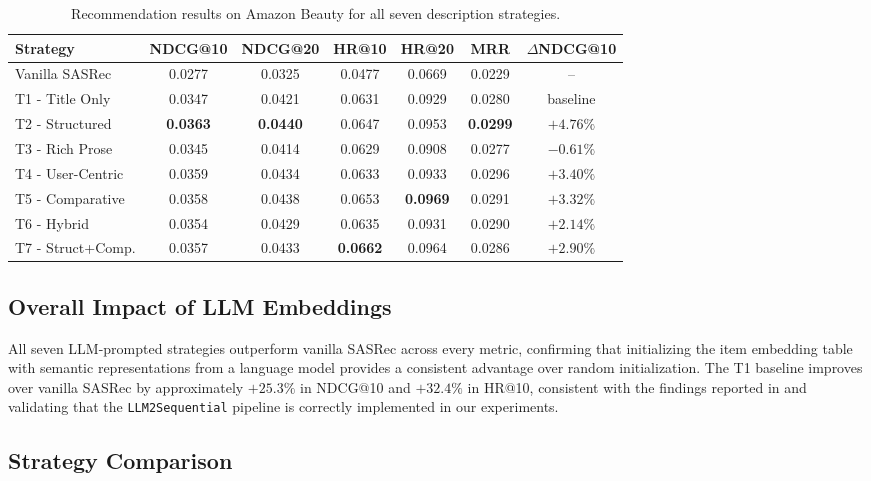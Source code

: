 \documentclass[12pt,a4paper]{report}
\begin{document}
\begin{table}[h]
\centering
\caption{Recommendation results on Amazon Beauty for all seven description strategies.}
\label{tab:promptcraft_results}
\small
\begin{tabular}{p{2.4cm} c c c c c c}
\toprule
\textbf{Strategy} & \textbf{NDCG@10} &
\textbf{NDCG@20} & \textbf{HR@10} & \textbf{HR@20} & \textbf{MRR} &
\(\Delta\)\textbf{NDCG@10} \\
\midrule
Vanilla SASRec    & 0.0277 & 0.0325 & 0.0477 & 0.0669 & 0.0229 & -- \\
\midrule
T1 - Title Only    & 0.0347 & 0.0421 & 0.0631 & 0.0929 & 0.0280 & baseline \\
T2 - Structured    & \textbf{0.0363} & \textbf{0.0440} & 0.0647 & 0.0953 & \textbf{0.0299} & \(\mathbf{+4.76\%}\) \\
T3 - Rich Prose    & 0.0345 & 0.0414 & 0.0629 & 0.0908 & 0.0277 & \(-0.61\%\) \\
T4 - User-Centric  & 0.0359 & 0.0434 & 0.0633 & 0.0933 & 0.0296 & \(+3.40\%\) \\
T5 - Comparative   & 0.0358 & 0.0438 & 0.0653 & \textbf{0.0969} & 0.0291 & \(+3.32\%\) \\
T6 - Hybrid        & 0.0354 & 0.0429 & 0.0635 & 0.0931 & 0.0290 & \(+2.14\%\) \\
T7 - Struct+Comp.  & 0.0357 & 0.0433 & \textbf{0.0662} & 0.0964 & 0.0286 & \(+2.90\%\) \\
\bottomrule
\end{tabular}
\end{table}

\subsection*{Overall Impact of LLM Embeddings}

\justifying
All seven LLM-prompted strategies outperform vanilla SASRec across every
metric, confirming that initializing the item embedding table with semantic
representations from a language model provides a consistent advantage over
random initialization. The T1 baseline improves over vanilla SASRec by
approximately \(+25.3\%\) in NDCG@10 and \(+32.4\%\) in HR@10, consistent with
the findings reported in \citep{boz2025} and validating that the
\texttt{LLM2Sequential} pipeline is correctly implemented in our experiments.

\subsection*{Strategy Comparison}
\end{document}
